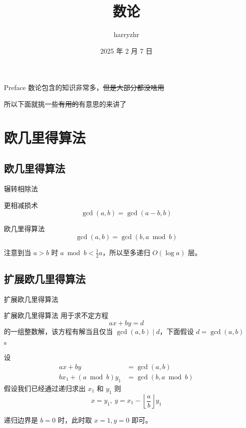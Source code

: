 \documentclass[UTF8]{beamer}
\title{数论}
\author{harryzhr}
\date{2025 年 2 月 7 日}
\begin{document}
    \maketitle

    \begin{frame}{Preface}
        数论包含的知识非常多，\sout{但是大部分都没啥用}

        所以下面就挑一些\sout{有用的}有意思的来讲了
    \end{frame}

    \section{欧几里得算法}
    \subsection{欧几里得算法}
    \begin{frame}{辗转相除法}
        \begin{block}{更相减损术}
            $$
            \gcd(a,b) = \gcd(a-b, b)
            $$
        \end{block}

        \begin{block}{欧几里得算法}
            $$
            \gcd(a,b)=\gcd(b,a \bmod b)
            $$
        \end{block}
        注意到当 $a>b$ 时 $a\bmod b < \frac 12 a$，所以至多递归 $O(\log a)$ 层。
    \end{frame}

    \subsection{扩展欧几里得算法}

    \begin{frame}{扩展欧几里得算法}
        \begin{block}{扩展欧几里得算法}
            用于求不定方程 
            $$
            ax+by=d
            $$
            的一组整数解，该方程有解当且仅当 $\gcd(a,b)\mid d$，下面假设 $d = \gcd(a,b)$。
        \end{block}

        设
        $$
        \begin{aligned}
        ax+by&=\gcd(a,b)\\
        bx_1+(a\bmod b)y_1&=\gcd(b,a\bmod b)
        \end{aligned}
        $$
        假设我们已经通过递归求出 $x_1$ 和 $y_1$ 则
        $$
        x=y_1,\ y=x_1-\left\lfloor\frac{a}{b}\right\rfloor y_1
        $$

        递归边界是 $b=0$ 时，此时取 $x=1,y=0$ 即可。
    \end{frame}
\end{document}
